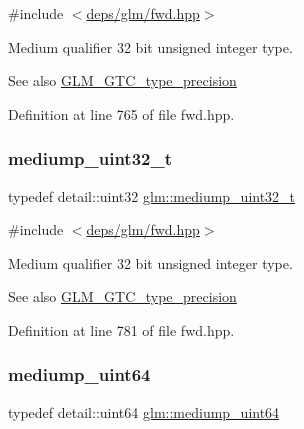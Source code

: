 {\ttfamily \#include $<$\hyperlink{fwd_8hpp}{deps/glm/fwd.\+hpp}$>$}

Medium qualifier 32 bit unsigned integer type. \begin{DoxySeeAlso}{See also}
\hyperlink{group__gtc__type__precision}{G\+L\+M\+\_\+\+G\+T\+C\+\_\+type\+\_\+precision} 
\end{DoxySeeAlso}


Definition at line 765 of file fwd.\+hpp.

\mbox{\label{group__gtc__type__precision_gac7782c1e393f9ad47e41a177a685f287}} 
\subsubsection{\texorpdfstring{mediump\+\_\+uint32\+\_\+t}{mediump\_uint32\_t}}
{\footnotesize\ttfamily typedef detail\+::uint32 \hyperlink{group__gtc__type__precision_gac7782c1e393f9ad47e41a177a685f287}{glm\+::mediump\+\_\+uint32\+\_\+t}}



{\ttfamily \#include $<$\hyperlink{fwd_8hpp}{deps/glm/fwd.\+hpp}$>$}

Medium qualifier 32 bit unsigned integer type. \begin{DoxySeeAlso}{See also}
\hyperlink{group__gtc__type__precision}{G\+L\+M\+\_\+\+G\+T\+C\+\_\+type\+\_\+precision} 
\end{DoxySeeAlso}


Definition at line 781 of file fwd.\+hpp.

\mbox{\label{group__gtc__type__precision_ga6685788d15d0a973ee7c2460d0456dc1}} 
\subsubsection{\texorpdfstring{mediump\+\_\+uint64}{mediump\_uint64}}
{\footnotesize\ttfamily typedef detail\+::uint64 \hyperlink{group__gtc__type__precision_ga6685788d15d0a973ee7c2460d0456dc1}{glm\+::mediump\+\_\+uint64}}



